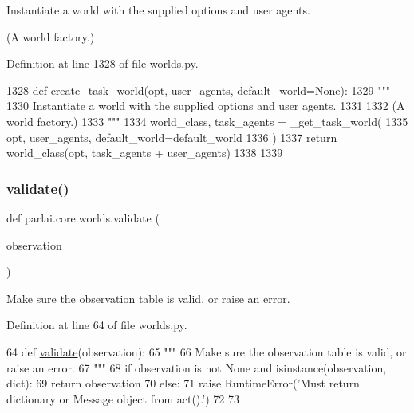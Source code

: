 \begin{DoxyVerb}Instantiate a world with the supplied options and user agents.

(A world factory.)
\end{DoxyVerb}
 

Definition at line 1328 of file worlds.\+py.


\begin{DoxyCode}
1328 \textcolor{keyword}{def }\hyperlink{namespaceparlai_1_1core_1_1worlds_a055ee493c9ed03ecff4832f52b408f8c}{create\_task\_world}(opt, user\_agents, default\_world=None):
1329     \textcolor{stringliteral}{"""}
1330 \textcolor{stringliteral}{    Instantiate a world with the supplied options and user agents.}
1331 \textcolor{stringliteral}{}
1332 \textcolor{stringliteral}{    (A world factory.)}
1333 \textcolor{stringliteral}{    """}
1334     world\_class, task\_agents = \_get\_task\_world(
1335         opt, user\_agents, default\_world=default\_world
1336     )
1337     \textcolor{keywordflow}{return} world\_class(opt, task\_agents + user\_agents)
1338 
1339 
\end{DoxyCode}
\mbox{\label{namespaceparlai_1_1core_1_1worlds_afc3fad603b7bce41dbdc9cdc04a9c794}} 
\subsubsection{\texorpdfstring{validate()}{validate()}}
{\footnotesize\ttfamily def parlai.\+core.\+worlds.\+validate (\begin{DoxyParamCaption}\item[{}]{observation }\end{DoxyParamCaption})}

\begin{DoxyVerb}Make sure the observation table is valid, or raise an error.
\end{DoxyVerb}
 

Definition at line 64 of file worlds.\+py.


\begin{DoxyCode}
64 \textcolor{keyword}{def }\hyperlink{namespaceparlai_1_1core_1_1worlds_afc3fad603b7bce41dbdc9cdc04a9c794}{validate}(observation):
65     \textcolor{stringliteral}{"""}
66 \textcolor{stringliteral}{    Make sure the observation table is valid, or raise an error.}
67 \textcolor{stringliteral}{    """}
68     \textcolor{keywordflow}{if} observation \textcolor{keywordflow}{is} \textcolor{keywordflow}{not} \textcolor{keywordtype}{None} \textcolor{keywordflow}{and} isinstance(observation, dict):
69         \textcolor{keywordflow}{return} observation
70     \textcolor{keywordflow}{else}:
71         \textcolor{keywordflow}{raise} RuntimeError(\textcolor{stringliteral}{'Must return dictionary or Message object from act().'})
72 
73 
\end{DoxyCode}
